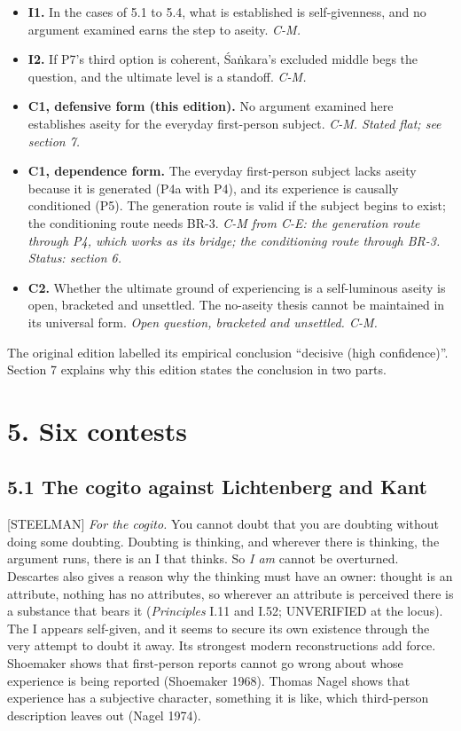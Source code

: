 \documentclass[11pt]{article}
\newcommand{\register}[1]{{\ttfamily\small #1}}
\begin{document}
\begin{itemize}
\item \textbf{I1.} In the cases of 5.1 to 5.4, what is established is self-givenness, and no argument examined earns the step to aseity. \emph{C-M.}
\item \textbf{I2.} If P7's third option is coherent, Śaṅkara's excluded middle begs the question, and the ultimate level is a standoff. \emph{C-M.}
\item \textbf{C1, defensive form (this edition).} No argument examined here establishes aseity for the everyday first-person subject. \emph{C-M. Stated flat; see section 7.}
\item \textbf{C1, dependence form.} The everyday first-person subject lacks aseity because it is generated (P4a with P4), and its experience is causally conditioned (P5). The generation route is valid if the subject begins to exist; the conditioning route needs BR-3. \emph{C-M from C-E: the generation route through P4, which works as its bridge; the conditioning route through BR-3. Status: section 6.}
\item \textbf{C2.} Whether the ultimate ground of experiencing is a self-luminous aseity is open, bracketed and unsettled. The no-aseity thesis cannot be maintained in its universal form. \emph{Open question, bracketed and unsettled. C-M.}
\end{itemize}
The original edition labelled its empirical conclusion ``decisive (high confidence)''. Section 7 explains why this edition states the conclusion in two parts.

\section*{5. Six contests}

\subsection*{5.1 The cogito against Lichtenberg and Kant}

\register{[STEELMAN]} \emph{For the cogito.} You cannot doubt that you are doubting without doing some doubting. Doubting is thinking, and wherever there is thinking, the argument runs, there is an I that thinks. So \emph{I am} cannot be overturned. Descartes also gives a reason why the thinking must have an owner: thought is an attribute, nothing has no attributes, so wherever an attribute is perceived there is a substance that bears it (\emph{Principles} I.11 and I.52; UNVERIFIED at the locus). The I appears self-given, and it seems to secure its own existence through the very attempt to doubt it away. Its strongest modern reconstructions add force. Shoemaker shows that first-person reports cannot go wrong about whose experience is being reported (Shoemaker 1968). Thomas Nagel shows that experience has a subjective character, something it is like, which third-person description leaves out (Nagel 1974).
\end{document}
